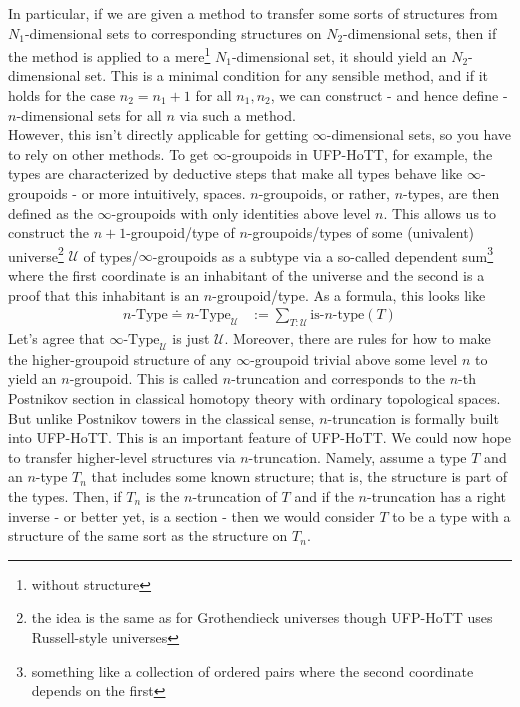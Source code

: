 In particular, if we are given a method to transfer some sorts of structures from $N_{1}$-dimensional sets to corresponding structures on $N_{2}$-dimensional sets, then if the method is applied to a mere\footnote{without structure} $N_{1}$-dimensional set, it should yield an $N_{2}$-dimensional set.
This is a minimal condition for any sensible method, and if it holds for the case $n_{2} = n_{1} + 1$ for all $n_{1},n_{2}$, we can construct - and hence define - $n$-dimensional sets for all $n$ via such a method.
\\
However, this isn't directly applicable for getting $\infty$-dimensional sets, so you have to rely on other methods.
To get $\infty$-groupoids in UFP-HoTT, for example, the types are characterized by deductive steps that make all types behave like $\infty$-groupoids - or more intuitively, spaces.
$n$-groupoids, or rather, $n$-types, are then defined as the $\infty$-groupoids with only identities above level $n$.
This allows us to construct the $n+1$-groupoid/type of $n$-groupoids/types of some (univalent) universe\footnote{the idea is the same as for Grothendieck universes though UFP-HoTT uses Russell-style universes} $\mathcal{U}$ of types/$\infty$-groupoids as a subtype via a so-called dependent sum\footnote{something like a collection of ordered pairs where the second coordinate depends on the first} where the first coordinate is an inhabitant of the universe and the second is a proof that this inhabitant is an $n$-groupoid/type.
As a formula, this looks like
\begin{align*}
  n\textrm{-Type}
  \doteq
  n\textrm{-Type}_{\mathcal{U}}
  &:=
  \sum_{T \colon \mathcal{U}}
  \textrm{is-}n\textrm{-type}(T)
\end{align*}
Let's agree that $\infty\textrm{-Type}_{\mathcal{U}}$ is just $\mathcal{U}$.
Moreover, there are rules for how to make the higher-groupoid structure of any $\infty$-groupoid trivial above some level $n$ to yield an $n$-groupoid.
This is called $n$-truncation and corresponds to the $n$-th Postnikov section in classical homotopy theory with ordinary topological spaces.
But unlike Postnikov towers in the classical sense, $n$-truncation is formally built into UFP-HoTT.
This is an important feature of UFP-HoTT.
We could now hope to transfer higher-level structures via $n$-truncation.
Namely, assume a type $T$ and an $n$-type $T_{n}$ that includes some known structure; that is, the structure is part of the types.
Then, if $T_{n}$ is the $n$-truncation of $T$ and if the $n$-truncation has a right inverse - or better yet, is a section - then we would consider $T$ to be a type with a structure of the same sort as the structure on $T_{n}$.

